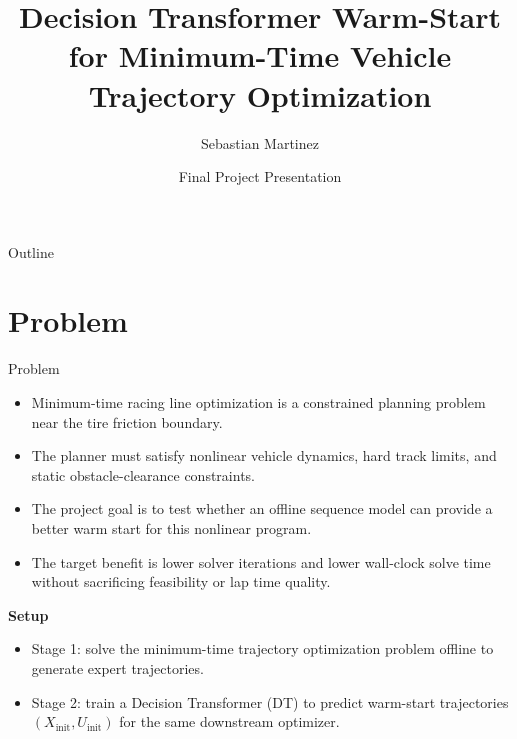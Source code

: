 \documentclass[aspectratio=169]{beamer}
\title{Decision Transformer Warm-Start for Minimum-Time Vehicle Trajectory Optimization}
\author{Sebastian Martinez}
\institute{Stanford CS234: Reinforcement Learning\\Department of Aeronautics \& Astronautics, Stanford University}
\date{Final Project Presentation}
\begin{document}
\begin{frame}[plain]
  \titlepage
\end{frame}

\begin{frame}{Outline}
  \tableofcontents
\end{frame}

\section{Problem}
\begin{frame}{Problem}
\begin{itemize}
  \item Minimum-time racing line optimization is a constrained planning problem near the tire friction boundary.
  \item The planner must satisfy nonlinear vehicle dynamics, hard track limits, and static obstacle-clearance constraints.
  \item The project goal is to test whether an offline sequence model can provide a better warm start for this nonlinear program.
  \item The target benefit is lower solver iterations and lower wall-clock solve time without sacrificing feasibility or lap time quality.
\end{itemize}

\vspace{0.5em}
\textbf{Setup}
\begin{itemize}
  \item Stage 1: solve the minimum-time trajectory optimization problem offline to generate expert trajectories.
  \item Stage 2: train a Decision Transformer (DT) to predict warm-start trajectories $(X_{\text{init}}, U_{\text{init}})$ for the same downstream optimizer.
\end{itemize}
\end{frame}
\end{document}

